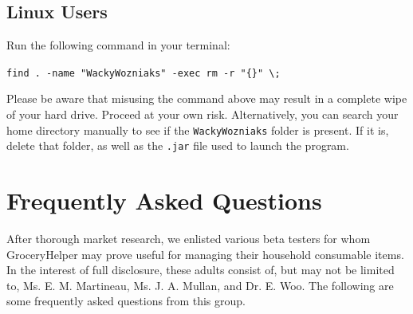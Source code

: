 \documentclass[letterpaper,12pt]{article}
\renewenvironment{enumerate}[1]{\begin{compactenum}#1}{\end{compactenum}}
\begin{document}
\subsection{Linux Users}
\begin{enumerate}
\item Run the following command in your terminal: 

\verb|find . -name "WackyWozniaks" -exec rm -r "{}" \;|
\end{enumerate}

Please be aware that misusing the command above may result in a complete wipe of your hard drive. Proceed at your own risk. Alternatively, you can search your home directory manually to see if the \verb|WackyWozniaks| folder is present. If it is, delete that folder, as well as the \verb|.jar| file used to launch the program. 

\pagebreak

\vspace{-0.2in}

\section{Frequently Asked Questions}

\vspace{-0.15in}

After thorough market research, we enlisted various beta testers for whom GroceryHelper may prove useful for managing their household consumable items. In the interest of full disclosure, these adults consist of, but may not be limited to, Ms. E. M. Martineau, Ms. J. A. Mullan, and Dr. E. Woo. The following are some frequently asked questions from this group.
\end{document}
